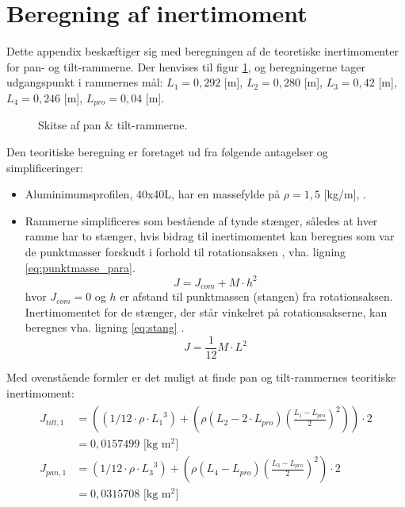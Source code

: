 \section{Beregning af inertimoment}
\label{sec:inertimomentberegning}
Dette appendix beskæftiger sig med beregningen af de teoretiske inertimomenter
for pan- og tilt-rammerne. Der henvises til figur \ref{fig:inerti_PTS}, og
beregningerne tager udgangspunkt i rammernes mål:
\({L_{1}} =0,292\) [m],
\({L_{2}} =0,280\) [m], \({L_{3}}= 0,42\) [m], \({L_{4}} =0,246\) [m], \({L_{pro}}=0,04\) [m].

\begin{figure}[!th]
\centering
\begin{tikzpicture}[scale=0.7]

\end{tikzpicture}
\caption[Skitse af pan \& tilt-rammerne]{Skitse af pan \& tilt-rammerne.}
\label{fig:inerti_PTS}
\end{figure}

Den teoritiske beregning er foretaget ud fra følgende antagelser og simplificeringer:
\begin{itemize}
\item Aluminimumsprofilen, 40x40L, har en massefylde på \(\rho=1,5\) [kg/m], \citep[Kap. 2 s. 4]{alu_profil_desitet}.
\item Rammerne simplificeres som bestående af tynde stænger, således at hver ramme har to stænger, hvis bidrag
til inertimomentet kan beregnes som var de punktmasser forskudt i forhold til rotationsaksen \citep[s. 254, ligning 10.36]{fund_of_physics},
vha. ligning \ref{eq:punktmasse_para}.
\begin{equation}
J={ J }_{ com }+M\cdot { h }^{ 2 }
\label{eq:punktmasse_para} 
\end{equation}
hvor \({J_{com}} = 0\) og \(h\) er afstand til punktmassen (stangen) fra rotationsaksen.
Inertimomentet for de stænger, der står vinkelret på rotationsakserne, kan beregnes vha. ligning \ref{eq:stang}
\citep[s. 255, tabel 10-2e]{fund_of_physics}.
\begin{equation}
J=\frac { 1 }{ 12 } M\cdot { L }^{ 2 }
\label{eq:stang} 
\end{equation}
\end{itemize}

Med ovenstående formler er det muligt at finde pan og tilt-rammernes teoritiske inertimoment:
\begin{align}
\label{eq:inerti_tilt_pan}
\begin{split}
{ J }_{ tilt,1 } &= \left( \left( 1/12\cdot \rho \cdot { {L_{1}} }^{ 3 } \right) +\left( \rho \left( {L_{2}}-2\cdot {L_{pro}} \right) { \left( \frac { {L_{1}}-{L_{pro}}}{ 2 }  \right)  }^{ 2 } \right)  \right) \cdot 2
\\
 &= 0,0157499 \text{ [kg m$^2$]}
\\
{ J }_{ pan,1 }&=\left( 1/12\cdot \rho \cdot { { L }_{ 3 } }^{ 3 } \right) +\left( \rho \left( { L }_{ 4 }-{ L }_{ pro } \right) { \left( \frac { { L }_{ 3 }-{ L }_{ pro } }{ 2 }  \right)  }^{ 2 } \right) \cdot 2
\\
 &=0,0315708 \text{ [kg m$^2$]}
\end{split}
\end{align}

